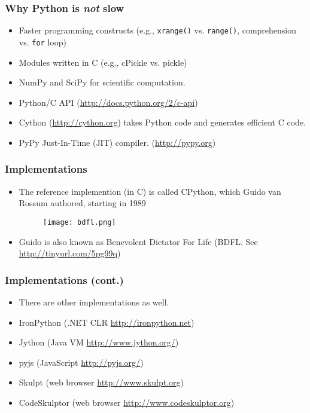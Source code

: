 \documentclass{beamer}
\begin{document}
\begin{frame}[fragile]
\frametitle{Why Python is \emph{not} slow}
\begin{itemize}
\item Faster programming constructs (e.g., 
      \lstinline{xrange()} vs. 
      \lstinline{range()}, comprehension vs. \lstinline{for} loop)
\item Modules written in C
      (e.g., cPickle vs. pickle)
\item NumPy and SciPy for scientific computation.
\item Python/C API
      (\url{http://docs.python.org/2/c-api})
\item Cython (\url{http://cython.org}) takes Python
      code and generates efficient C code. 
\item PyPy Just-In-Time (JIT) compiler. 
      (\url{http://pypy.org}) 
\end{itemize}
\end{frame}

\begin{frame}[fragile]
\frametitle{Implementations}
\begin{itemize}
\item The reference implemention (in C) is called
      CPython, which 
      Guido van Rossum authored, starting in 1989
\begin{figure}[h]
\texttt{[image: bdfl.png]}
\end{figure}
\item Guido is also known as Benevolent Dictator For Life 
      (BDFL. See \url{http://tinyurl.com/5pg99q})
\end{itemize}
\end{frame}

\begin{frame}[fragile]
\frametitle{Implementations (cont.)}
\begin{itemize}
\item There are other implementations as well.
\item IronPython (.NET CLR \url{http://ironpython.net})
\item Jython (Java VM \url{http://www.jython.org/})
\item pyjs (JavaScript \url{http://pyjs.org/})
\item Skulpt (web browser \url{http://www.skulpt.org})
\item CodeSkulptor (web browser \url{http://www.codeskulptor.org})
\end{itemize}
\end{frame}
\end{document}
